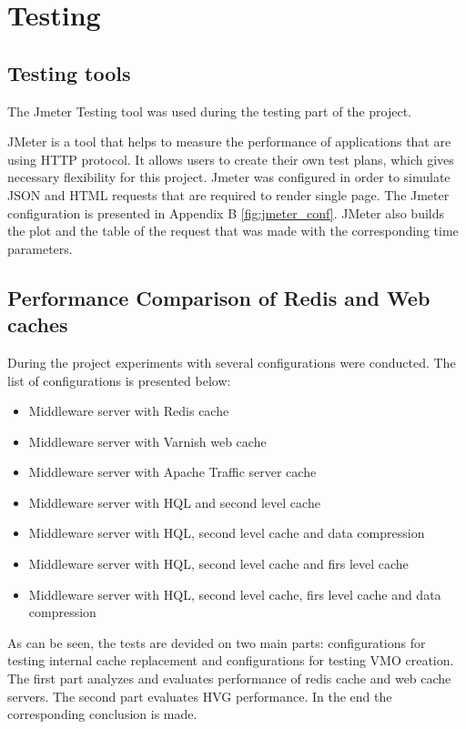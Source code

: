 \section{Testing}

\subsection{Testing tools}

The Jmeter Testing tool was used during the testing part of the project. 

JMeter is a tool that helps to measure the performance of applications that are using HTTP protocol. It allows users to create their own test plans, which gives necessary flexibility for this project. Jmeter was configured in order to simulate JSON and HTML requests that are required to render single page. The Jmeter configuration is presented in Appendix B \ref{fig:jmeter_conf}. JMeter also builds the plot and the table of the request that was made with the corresponding time parameters.


\subsection{Performance Comparison of Redis and Web caches}


During the project experiments with several configurations were conducted. The list of configurations is presented below:

\begin{itemize}
  \item Middleware server with Redis cache
  \item Middleware server with Varnish web cache
  \item Middleware server with Apache Traffic server cache
  \item Middleware server with HQL and second level cache
  \item Middleware server with HQL, second level cache and data compression
  \item Middleware server with HQL, second level cache and firs level cache
  \item Middleware server with HQL, second level cache, firs level cache and data compression
\end{itemize}

As can be seen, the tests are devided on two main parts: configurations for testing internal cache replacement and configurations for testing VMO creation. The first part analyzes and evaluates performance of redis cache and web cache servers. The second part  evaluates HVG performance. In the end the corresponding conclusion is made. 

